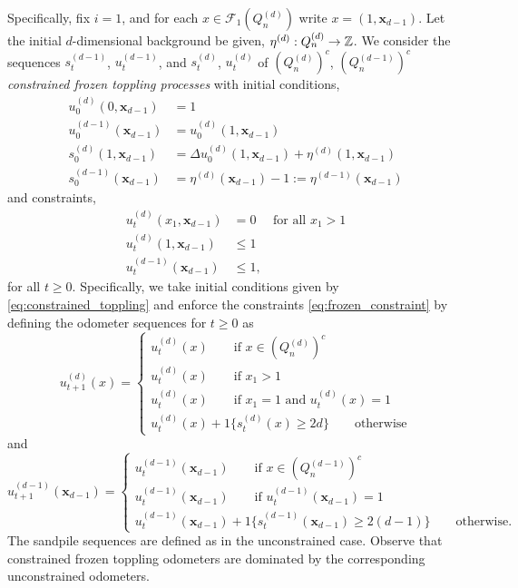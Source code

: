 \documentclass[12pt]{amsart}
\begin{document}
Specifically, fix $i = 1$,  and for each $x \in \mathcal{F}_{1}(Q_n^{(d)})$ write $x = (1, \mathbf{x}_{d-1})$. 
Let the initial $d$-dimensional background be given, $\eta^{(d)}: Q_n^{(d)} \to \mathbb{Z}$. 
We consider the sequences $s_t^{(d-1)}$, $u_t^{(d-1)}$, and $s_t^{(d)}$, $u_t^{(d)}$ of $(Q_n^{(d)})^c$, $(Q_n^{(d-1)})^c$ {\it constrained  frozen toppling processes} with initial conditions,
\begin{equation} \label{eq:constrained_toppling}
\begin{aligned}
u_0^{(d)}(0,\mathbf{x}_{d-1}) &= 1 \\
u_0^{(d-1)}(\mathbf{x}_{d-1}) &= u_0^{(d)}(1, \mathbf{x}_{d-1}) \\
s_0^{(d)}(1, \mathbf{x}_{d-1}) &=  \Delta u_0^{(d)}(1, \mathbf{x}_{d-1}) + \eta^{(d)}(1,\mathbf{x}_{d-1}) \\
s_0^{(d-1)}(\mathbf{x}_{d-1}) &=  \eta^{(d)}(\mathbf{x}_{d-1})-1 := \eta^{(d-1)}(\mathbf{x}_{d-1})
\end{aligned}
\end{equation}
and constraints,
\begin{equation} \label{eq:frozen_constraint}
\begin{aligned}
u_t^{(d)}(x_1,\mathbf{x}_{d-1}) &= 0 \quad \mbox{ for all $x_1 > 1$} \\
u_t^{(d)}(1, \mathbf{x}_{d-1}) & \leq 1 \\
u_t^{(d-1)}(\mathbf{x}_{d-1}) &\leq 1,
\end{aligned}
\end{equation}
for all $t \geq 0$. Specifically, we take initial conditions given by \eqref{eq:constrained_toppling}
and enforce the constraints \eqref{eq:frozen_constraint} by defining the odometer sequences for $t \geq 0$ as
\[
u_{t+1}^{(d)}(x) = 
\begin{cases}
u_t^{(d)}(x) \qquad \mbox{if $x \in (Q_n^{(d)})^c$} \\
u_t^{(d)}(x) \qquad \mbox{if $x_1 > 1$} \\
u_t^{(d)}(x) \qquad \mbox{if $x_1 = 1$ and $u_t^{(d)}(x)  = 1$} \\
u_t^{(d)}(x) + 1\{s_t^{(d)}(x) \geq 2 d\} \qquad \mbox{otherwise}
\end{cases}
\]
and
\[
u_{t+1}^{(d-1)}(\mathbf x_{d-1}) = 
\begin{cases}
u_t^{(d-1)}(\mathbf x_{d-1}) \qquad \mbox{if $x \in (Q_n^{(d-1)})^c$} \\
u_t^{(d-1)}(\mathbf x_{d-1}) \qquad \mbox{if $u_t^{(d-1)}(\mathbf{x}_{d-1}) = 1$} \\
u_t^{(d-1)}(\mathbf x_{d-1}) + 1\{s_t^{(d-1)}(\mathbf x_{d-1}) \geq 2 (d-1)\} \qquad \mbox{otherwise}.
\end{cases}
\]
The sandpile sequences are defined as in the unconstrained case. 
Observe that constrained frozen toppling odometers are dominated by the corresponding unconstrained odometers.
\end{document}

